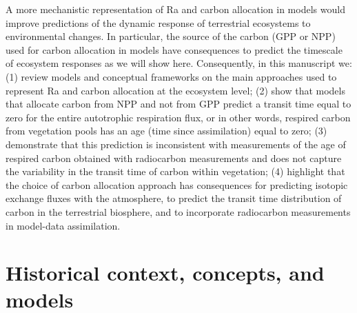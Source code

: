 \documentclass[bg, manuscript]{copernicus}
\begin{document}
A more mechanistic representation of Ra and carbon allocation in models would improve predictions of the dynamic response of terrestrial ecosystems to environmental changes. In particular, the source of the carbon (GPP or NPP) used for carbon allocation in models have consequences to predict the timescale of ecosystem responses as we will show here. 
Consequently, in this manuscript we: (1) review models and conceptual frameworks on the main approaches used to represent Ra and carbon allocation at the ecosystem level; (2) show that models that allocate carbon from NPP and not from GPP predict a transit time equal to zero for the entire autotrophic respiration flux, or in other words, respired carbon from vegetation pools has an age (time since assimilation) equal to zero; (3) demonstrate that this prediction is inconsistent with measurements of the age of respired carbon obtained with radiocarbon measurements and does not capture the variability in the transit time of carbon within vegetation; (4) highlight that the choice of carbon allocation approach has consequences for predicting isotopic exchange fluxes with the atmosphere, to predict the transit time distribution of carbon in the terrestrial biosphere, and to incorporate radiocarbon measurements in model-data assimilation. 

\section{Historical context, concepts, and models}
\end{document}
